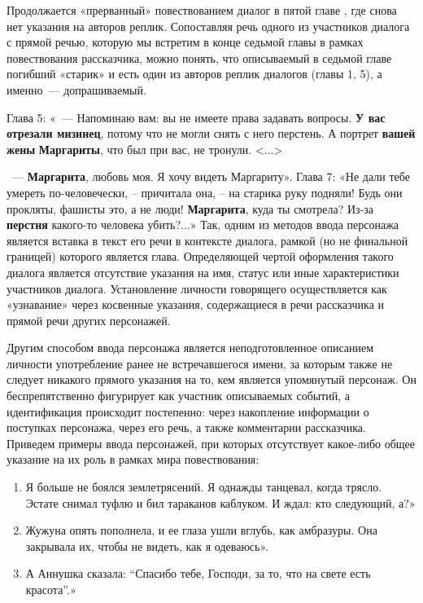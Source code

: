 \documentclass{kursa4}
\begin{document}
{        Продолжается «прерванный» повествованием диалог в пятой главе , где снова нет указания на авторов реплик. Сопоставляя речь одного из участников диалога с прямой речью, которую мы встретим в конце седьмой главы в рамках повествования рассказчика, можно понять, что описываемый в седьмой главе погибший «старик» и есть один из авторов реплик диалогов (главы 1, 5), а именно~--- допрашиваемый. 

        Глава 5: «~--- Напоминаю вам: вы не имеете права задавать вопросы. \textbf{У вас отрезали мизинец}, потому что не могли снять с него перстень. А портрет \textbf{вашей жены }\textbf{Маргариты}, что был при вас, не тронули. \textless{}...\textgreater{}

        ~--- \textbf{Маргарита}, любовь моя. Я хочу видеть Маргариту». Глава 7: «Не дали тебе умереть по-человечески, – причитала она, – на старика руку подняли! Будь они прокляты, фашисты это, а не люди! \textbf{Маргарита}, куда ты смотрела? Из-за \textbf{перстня} какого-то человека убить?...» Так, одним из методов ввода персонажа является вставка в текст его речи в контексте диалога, рамкой (но не финальной границей) которого является глава. Определяющей чертой оформления такого диалога является отсутствие указания на имя, статус или иные характеристики участников диалога. Установление личности говорящего осуществляется как «узнавание» через косвенные указания, содержащиеся в речи рассказчика и прямой речи других персонажей. 

        Другим способом ввода персонажа является неподготовленное описанием личности употребление ранее не встречавшегося имени, за которым также не следует никакого прямого указания на то, кем является упомянутый персонаж. Он беспрепятственно фигурирует как участник описываемых событий, а идентификация происходит постепенно: через накопление информации о поступках персонажа, через его речь, а также комментарии рассказчика. Приведем примеры ввода персонажей, при которых отсутствует какое-либо общее указание на их роль в рамках мира повествования: 

        \begin{enumerate}
          \item Я больше не боялся землетрясений. Я однажды танцевал, когда трясло. Эстате снимал туфлю и бил тараканов каблуком. И ждал: кто следующий, а?» \item Жужуна опять пополнела, и ее глаза ушли вглубь, как амбразуры. Она закрывала их, чтобы не видеть, как я одеваюсь». 
          \item А Аннушка сказала: “Спасибо тебе, Господи, за то, что на свете есть красота”.» \end{enumerate}

}
\end{document}
